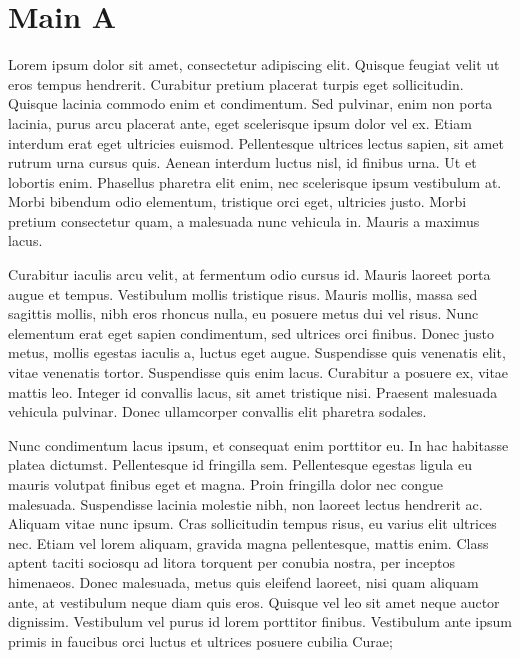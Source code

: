 \section{Main A}
Lorem ipsum dolor sit amet, consectetur adipiscing elit.
Quisque feugiat velit ut eros tempus hendrerit.
Curabitur pretium placerat turpis eget sollicitudin.
Quisque lacinia commodo enim et condimentum.
Sed pulvinar, enim non porta lacinia, purus arcu placerat ante, eget scelerisque ipsum dolor vel ex.
Etiam interdum erat eget ultricies euismod.
Pellentesque ultrices lectus sapien, sit amet rutrum urna cursus quis.
Aenean interdum luctus nisl, id finibus urna.
Ut et lobortis enim.
Phasellus pharetra elit enim, nec scelerisque ipsum vestibulum at.
Morbi bibendum odio elementum, tristique orci eget, ultricies justo.
Morbi pretium consectetur quam, a malesuada nunc vehicula in.
Mauris a maximus lacus.


Curabitur iaculis arcu velit, at fermentum odio cursus id.
Mauris laoreet porta augue et tempus.
Vestibulum mollis tristique risus.
Mauris mollis, massa sed sagittis mollis, nibh eros rhoncus nulla, eu posuere metus dui vel risus.
Nunc elementum erat eget sapien condimentum, sed ultrices orci finibus.
Donec justo metus, mollis egestas iaculis a, luctus eget augue.
Suspendisse quis venenatis elit, vitae venenatis tortor.
Suspendisse quis enim lacus.
Curabitur a posuere ex, vitae mattis leo.
Integer id convallis lacus, sit amet tristique nisi.
Praesent malesuada vehicula pulvinar.
Donec ullamcorper convallis elit pharetra sodales.


Nunc condimentum lacus ipsum, et consequat enim porttitor eu.
In hac habitasse platea dictumst.
Pellentesque id fringilla sem.
Pellentesque egestas ligula eu mauris volutpat finibus eget et magna.
Proin fringilla dolor nec congue malesuada.
Suspendisse lacinia molestie nibh, non laoreet lectus hendrerit ac.
Aliquam vitae nunc ipsum.
Cras sollicitudin tempus risus, eu varius elit ultrices nec.
Etiam vel lorem aliquam, gravida magna pellentesque, mattis enim.
Class aptent taciti sociosqu ad litora torquent per conubia nostra, per inceptos himenaeos.
Donec malesuada, metus quis eleifend laoreet, nisi quam aliquam ante, at vestibulum neque diam quis eros.
Quisque vel leo sit amet neque auctor dignissim.
Vestibulum vel purus id lorem porttitor finibus.
Vestibulum ante ipsum primis in faucibus orci luctus et ultrices posuere cubilia Curae;



